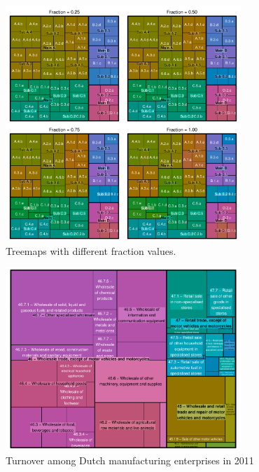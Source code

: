 \documentclass[journal]{vgtc}                %
\begin{document}
\begin{figure}[htb]
  \centering
  \includegraphics[width=3.5in]{Treemaps_hue.pdf}
  \caption{Treemaps with different fraction values.}\label{fig:treemapf}
\end{figure}





\begin{figure}[htb]
  \centering
  \includegraphics[width=3.5in]{TMbusiness.pdf}

  \caption{Turnover among Dutch manufacturing enterprises in 2011}\label{fig:treemapApp}

\end{figure}
\end{document}
